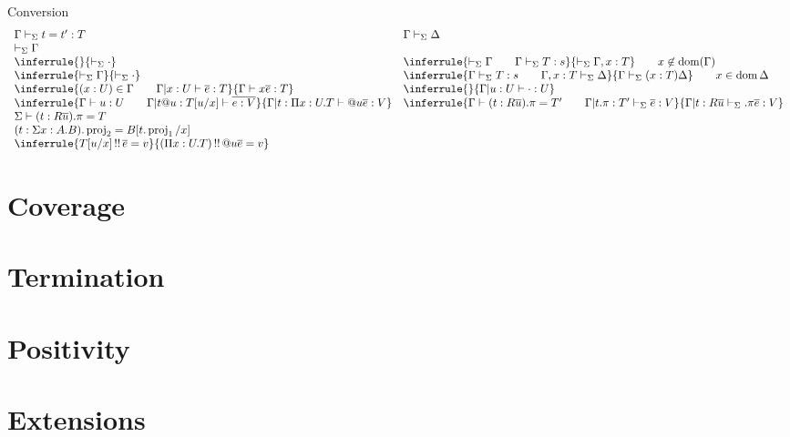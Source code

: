 \documentclass[acmlarge]{acmart}\settopmatter{}
\DeclareMathOperator{\dom}{dom}
\DeclareMathOperator{\proj}{proj}
\renewcommand{\|}{|}
\begin{document}
Conversion 
\[
\begin{array}{ll}
\Gamma \vdash_\Sigma t = t' : T & \Gamma \vdash_\Sigma \Delta \\
\vdash_\Sigma \Gamma & \\

\inferrule{}
{\vdash_\Sigma \cdot} & 
\inferrule{\vdash_\Sigma \Gamma \qquad \Gamma \vdash_\Sigma T:s}
{\vdash_\Sigma \Gamma, x : T} \qquad x \not\in \dom(\Gamma) \\

\inferrule{\vdash_\Sigma \Gamma}
{\vdash_\Sigma \cdot} &
\inferrule{\Gamma \vdash_\Sigma T : s \qquad \Gamma, x:T \vdash_\Sigma \Delta}
{\Gamma \vdash_\Sigma (x:T) \Delta}
\qquad x \in \dom{\Delta} \\

\inferrule{(x:U)\in \Gamma \qquad \Gamma | x:U \vdash \overline{e}:T}
{\Gamma \vdash x \overline{e} : T} 
&
\inferrule{}
{\Gamma \| u:U \vdash \cdot : U}
\\
\inferrule{\Gamma \vdash u:U \qquad \Gamma \| t@u:T[u/x] \vdash \overline{e : V}}
{\Gamma \| t : \Pi x:U.T \vdash @u \overline{e}:V}
&
\inferrule{ \Gamma \vdash (t:R\overline{u}).\pi = T' 
\qquad \Gamma \| t.\pi :T' \vdash_\Sigma \overline{e}:V}
{ \Gamma \| t : R \overline{u}  \vdash_\Sigma .\pi \overline{e}:V}
\\
\Sigma \vdash (t:R\overline{u}).\pi = T
\\
(t: \Sigma x:A.B).\proj_2 = B[t.\proj_1/x] &
\\
\inferrule{T[u/x] \twobang \overline{e} = v}
{(\Pi x:U.T) \twobang @ u \overline{e} = v}
\end{array}
\]


\section{Coverage}
\label{sec:coverage}

\section{Termination}
\label{sec:termination}

\section{Positivity}
\label{sec:positivity}

\section{Extensions}
\label{sec:extensions}
\end{document}
